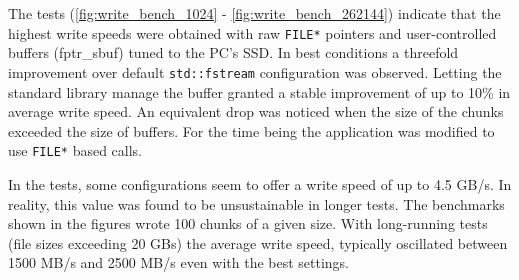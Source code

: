   \newpage
The tests (\autoref{fig:write_bench_1024} - \autoref{fig:write_bench_262144})
indicate that the highest write speeds were obtained with
raw \lstinline{FILE*} pointers and user-controlled buffers (fptr\_sbuf) tuned
to the PC's SSD. In best conditions a threefold improvement
over default \lstinline{std::fstream} configuration was observed.
Letting the standard library manage the buffer
granted a stable improvement of up to 10\% in average write speed.
An equivalent drop was noticed when the size of the
chunks exceeded the size of buffers. For the time being the application 
was modified to use \lstinline{FILE*} based calls.


In the tests, some configurations seem to offer a write speed 
of up to 4.5 GB/s. In reality, this value was found to be unsustainable
in longer tests. The benchmarks shown in the figures wrote 100 chunks of a given size.
With long-running tests (file sizes exceeding 20 GBs) 
the average write speed, typically oscillated between 1500 MB/s and 2500 MB/s
even with the best settings.

